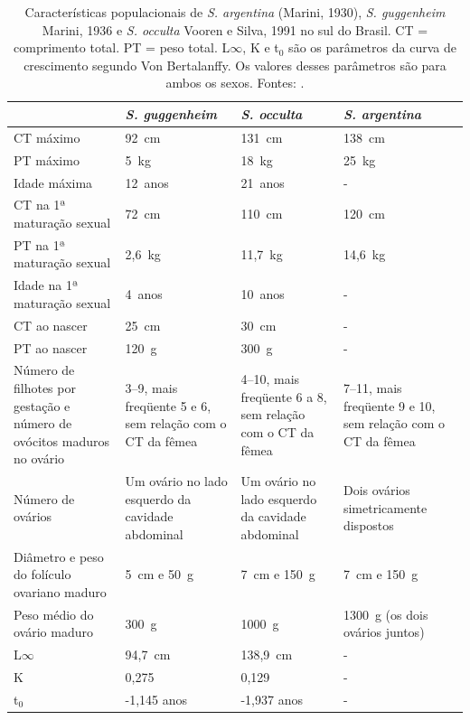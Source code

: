 \documentclass[a4paper,11pt,twoside,showtrims,onecolumn,openright,final]{memoir}
\begin{document}
%
%

\begin{table}
\caption[Características populacionais dos cações-anjo \emph{Squatina guggenheim}, 
	 \emph{S. occulta} e \emph{S. argentina}]
        {Características populacionais de \emph{S. argentina} (Marini, 1930),  
	 \emph{S. guggenheim} Marini, 1936   e  \emph{S. occulta} Vooren e Silva, 1991 
	 no sul do Brasil. CT = comprimento total. PT = peso total. 
	 L$\infty$, K e t$_{0}$ são 
	 os parâmetros da curva de crescimento segundo Von Bertalanffy. 
	 Os valores desses parâmetros são para ambos os sexos.    
	 Fontes: \citet{vooren1991,silva1996,vieira1996}.} %
\label{tab:anjos-parpopulacionais}
\begin{small}
\begin{tabularx}{\textwidth}{XXXX}
\toprule
		& \emph{S. guggenheim}		& \emph{S. occulta}		& \emph{S. argentina} \\
\midrule
\addlinespace
CT máximo	& 92~cm				& 131~cm			& 138~cm \\
\addlinespace
PT máximo	& 5~kg				& 18~kg				& 25~kg \\
\addlinespace
Idade máxima	& 12~anos			& 21~anos			& - \\
\addlinespace
CT na 1ª 
maturação 
sexual		& 72~cm				& 110~cm			& 120~cm \\
\addlinespace
PT na 1ª 
maturação 
sexual		& 2,6~kg			& 11,7~kg			& 14,6~kg \\
\addlinespace
Idade na 
1ª maturação 
sexual 		& 4~anos 			& 10~anos			& - \\
\addlinespace
CT ao nascer	& 25~cm				& 30~cm				& - \\
\addlinespace
PT ao nascer	& 120~g				& 300~g				& - \\
\addlinespace
Número de 
filhotes por 
gestação e 
número de 
ovócitos 
maduros no 
ovário		& 3--9, mais freqüente 5 e 6, 
		sem relação com o CT da 
		fêmea				& 4--10, mais freqüente 6 a 8, 
						sem relação com o CT da fêmea	& 7--11, mais freqüente 9 e 10, 
										sem relação com o CT da fêmea \\
\addlinespace
Número de 
ovários 	& Um ovário no lado esquerdo 
		da cavidade abdominal		& Um ovário no lado esquerdo da 
						cavidade abdominal		& Dois ovários simetricamente 
										dispostos \\
\addlinespace
Diâmetro e 
peso do 
folículo 
ovariano 
maduro		& 5~cm e 50~g			& 7~cm e 150~g			& 7~cm e 150~g \\
\addlinespace
Peso médio 
do ovário
maduro 
		& 300~g				& 1000~g			& 1300~g (os dois ovários juntos) \\
\addlinespace
L$\infty$	& 94,7~cm			& 138,9~cm			& - \\
\addlinespace
K		& 0,275				& 0,129				& - \\
\addlinespace 
t$_{0}$		& -1,145 anos			& -1,937 anos			& - \\
\bottomrule
\end{tabularx}
\end{small}
\end{table}
\end{document}
